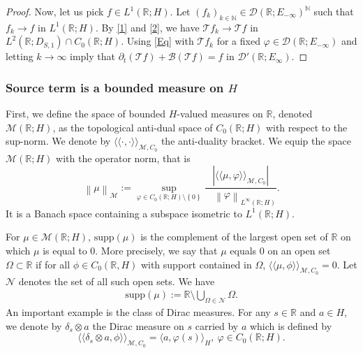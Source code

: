 \documentclass[11pt, letterpaper]{amsart}
\theoremstyle{definition}
\theoremstyle{remark}
\newcommand{\llangle}{\langle\!\langle}
\newcommand{\rrangle}{\rangle\!\rangle}
\numberwithin{equation}{section}
\begin{document}
\begin{proof}
Now, let us pick $f \in L^1(\mathbb{R};H).$ Let $(f_k)_{k \in \mathbb{N}} \in \mathcal{D}(\mathbb{R};E_{-\infty})^{\mathbb{N}}$ such that $ f_k \to f$ in $L^1(\mathbb{R};H)$. By \eqref{1} and \eqref{2}, we have $\mathcal{T}f_k \to \mathcal{T}f$ in $L^2(\mathbb{R};D_{S,1}) \cap C_0(\mathbb{R}; H)$.
Using \eqref{Eq} with $\mathcal{T}f_k$ for a fixed $\varphi \in \mathcal{D}(\mathbb{R};E_{-\infty})$ and letting $k \to \infty$ imply that $\partial_t (\mathcal{T}f) + \mathcal{B}(\mathcal{T}f) = f$ in $\mathcal{D}'(\mathbb{R};E_{\infty}).$
\end{proof}

\subsubsection{Source term is a bounded measure on $H$}  
First, we define the space of bounded $H$-valued measures on $\mathbb{R}$, denoted $\mathcal{M}(\mathbb{R};H)$, as the topological anti-dual space of $C_0(\mathbb{R};H)$ with respect to the sup-norm. We denote by $\llangle \cdot, \cdot \rrangle_{\mathcal{M},C_0}$ the anti-duality bracket. We equip the space $\mathcal{M}(\mathbb{R};H)$ with the operator norm, that is 
\begin{equation*}
    \left \|\mu   \right \|_{\mathcal{M}}:= \sup_{\varphi \in C_0(\mathbb{R};H)\setminus\left \{ 0 \right \}} \frac{\left | \llangle \mu, \varphi \rrangle_{\mathcal{M},C_0} \right |}{\ \ \ \ \left \|\varphi  \right \|_{L^\infty(\mathbb{R};H)}}.
\end{equation*}
It is a Banach space containing a subspace isometric to $L^1(\mathbb{R};H)$. 


For $\mu \in \mathcal{M}(\mathbb{R};H)$, $\mathrm{supp}(\mu)$ is the complement of the largest open set of $\mathbb{R}$ on which $\mu$ is equal to $0$. More precisely, we say that $\mu$ equals $0$ on an open set $\Omega \subset \mathbb{R}$ if for all $\phi \in C_0(\mathbb{R},H)$ with support contained in $\Omega$, $\llangle \mu, \phi \rrangle_{\mathcal{M},C_0}=0$. Let $\mathcal{N}$ denotes the set of all such open sets. We have 
\begin{align*}
    \mathrm{supp}(\mu ):= \mathbb{R}\setminus \bigcup_{\Omega \in \mathcal{N}} \Omega.
\end{align*}
An important example is the class of Dirac measures.  For any $s \in \mathbb{R}$ and $a \in H$, we denote by $\delta_s \otimes a$ the Dirac measure on $s$ carried by $a$ which is defined by 
\begin{equation*}
    \llangle \delta_s \otimes a,  \phi \rrangle_{\mathcal{M},C_0} =  \langle a,  \varphi(s) \rangle_H, \ \varphi \in C_0(\mathbb{R};H).
\end{equation*}
\end{document}
